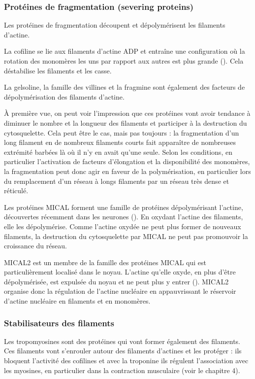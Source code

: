 \subsubsection{Protéines de fragmentation (severing proteins)}
Les protéines de fragmentation découpent et dépolymérisent les filaments d'actine. 

La cofiline se lie aux filaments d'actine ADP et entraîne une configuration où la rotation des monomères les uns par rapport aux autres est plus grande (\cite{mcgough_cofilin_1997}). Cela déstabilise les filaments et les casse. 

La gelsoline, la famille des villines et la fragmine sont également des facteurs de dépolymérisation des filaments d'actine. 

À première vue, on peut voir l'impression que ces protéines vont avoir tendance à diminuer le nombre et la longueur des filaments et participer à la destruction du cytosquelette. Cela peut être le cas, mais pas toujours : la fragmentation d'un long filament en de nombreux filaments courts fait apparaître de nombreuses extrémité barbées là où il n'y en avait qu'une seule. Selon les conditions, en particulier l'activation de facteurs d'élongation et la disponibilité des monomères, la fragmentation peut donc agir en faveur de la polymérisation, en particulier lors du remplacement d'un réseau à longs filaments par un réseau très dense et réticulé. 

Les protéines MICAL forment une famille de protéines dépolymérisant l'actine, découvertes récemment dans les neurones (\cite{hung_direct_2011}). En oxydant l'actine des filaments, elle les dépolymérise. Comme l'actine oxydée ne peut plus former de nouveaux filaments, la destruction du cytosquelette par MICAL ne peut pas promouvoir la croissance du réseau. 

MICAL2 est un membre de la famille des protéines MICAL qui est particulièrement localisé dans le noyau. L'actine qu'elle oxyde, en plus d'être dépolymérisée, est expulsée du noyau et ne peut plus y entrer (\cite{lundquist_redox_2014}). MICAL2 organise donc la régulation de l'actine nucléaire en appauvrissant le réservoir d'actine nucléaire en filaments et en monomères.

\subsubsection{Stabilisateurs des filaments}

Les tropomyosines sont des protéines qui vont former également des filaments. Ces filaments vont s'enrouler autour des filaments d'actines et les protéger : ils bloquent l'activité des cofilines et avec la troponine ils régulent l'association avec les myosines, en particulier dans la contraction musculaire (voir le chapitre 4).

